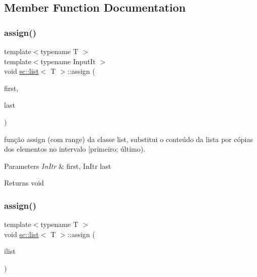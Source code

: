 \subsection{Member Function Documentation}
\mbox{\label{classsc_1_1list_a5886cd0296e187a96777dd837eaed99b}} 
\subsubsection{\texorpdfstring{assign()}{assign()}\hspace{0.1cm}{\footnotesize\ttfamily [1/6]}}
{\footnotesize\ttfamily template$<$typename T $>$ \\
template$<$typename Input\+It $>$ \\
void \mbox{\hyperlink{classsc_1_1list}{sc\+::list}}$<$ T $>$\+::assign (\begin{DoxyParamCaption}\item[{Input\+It}]{first,  }\item[{Input\+It}]{last }\end{DoxyParamCaption})}

função assign (com range) da classe list, substitui o conteúdo da lista por cópias dos elementos no intervalo \mbox{[}primeiro; último). 
\begin{DoxyParams}{Parameters}
{\em In\+Itr} & first, In\+Itr last \\
\hline
\end{DoxyParams}
\begin{DoxyReturn}{Returns}
void 
\end{DoxyReturn}
\mbox{\label{classsc_1_1list_a495ac9f4a80b40ba7d37e6badf24445f}} 
\subsubsection{\texorpdfstring{assign()}{assign()}\hspace{0.1cm}{\footnotesize\ttfamily [2/6]}}
{\footnotesize\ttfamily template$<$typename T $>$ \\
void \mbox{\hyperlink{classsc_1_1list}{sc\+::list}}$<$ T $>$\+::assign (\begin{DoxyParamCaption}\item[{std\+::initializer\+\_\+list$<$ T $>$}]{ilist }\end{DoxyParamCaption})}

